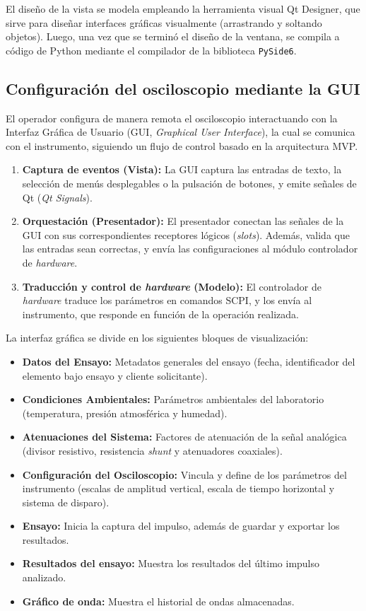El diseño de la vista se modela empleando la herramienta visual Qt Designer, que sirve para diseñar interfaces gráficas visualmente (arrastrando y soltando objetos). Luego, una vez que se terminó el diseño de la ventana, se compila a código de Python mediante el compilador de la biblioteca \texttt{PySide6}.


\subsection{Configuración del osciloscopio mediante la GUI}
\label{subsec:configuracion_gui}

El operador configura de manera remota el osciloscopio interactuando con la Interfaz Gráfica de Usuario (GUI, \emph{Graphical User Interface}), la cual se comunica con el instrumento, siguiendo un flujo de control basado en la arquitectura MVP.

\begin{enumerate}
    \item \textbf{Captura de eventos (Vista):} La GUI captura las entradas de texto, la selección de menús desplegables o la pulsación de botones, y emite señales de Qt (\emph{Qt Signals}).
    \item \textbf{Orquestación (Presentador):} El presentador conectan las señales de la GUI con sus correspondientes receptores lógicos (\emph{slots}). Además, valida que las entradas sean correctas, y envía las configuraciones al módulo controlador de \emph{hardware}.
    \item \textbf{Traducción y control de \emph{hardware} (Modelo):} El controlador de \emph{hardware} traduce los parámetros en comandos SCPI, y los envía al instrumento, que responde en función de la operación realizada.
\end{enumerate}

La interfaz gráfica se divide en los siguientes bloques de visualización:
\begin{itemize}
    \item \textbf{Datos del Ensayo:} Metadatos generales del ensayo (fecha, identificador del elemento bajo ensayo y cliente solicitante).
    \item \textbf{Condiciones Ambientales:} Parámetros ambientales del laboratorio (temperatura, presión atmosférica y humedad).
    \item \textbf{Atenuaciones del Sistema:} Factores de atenuación de la señal analógica (divisor resistivo, resistencia \emph{shunt} y atenuadores coaxiales).
    \item \textbf{Configuración del Osciloscopio:} Vincula y define de los parámetros del instrumento (escalas de amplitud vertical, escala de tiempo horizontal y sistema de disparo).
    \item \textbf{Ensayo:} Inicia la captura del impulso, además de guardar y exportar los resultados.
    \item \textbf{Resultados del ensayo:} Muestra los resultados del último impulso analizado.
    \item \textbf{Gráfico de onda:} Muestra el historial de ondas almacenadas.
\end{itemize}